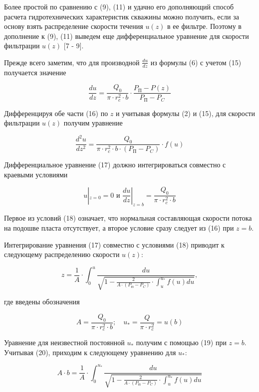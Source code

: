 \begin{multicols}{2}
Более простой по сравнению с (9), (11) и удачно его дополняющий способ
расчета гидротехнических характеристик скважины можно получить, если за
основу взять распределение скорости течения $u(z)$ в ее фильтре.
Поэтому в дополнение к (9), (11) выведем еще дифференциальное уравнение
для скорости фильтрации $u(z)$ {[}7 - 9{]}.

Прежде всего заметим, что для производной $\frac{du}{dz}$ из формулы
(6) с учетом (15) получается значение

\begin{equation}
\frac{du}{dz}=\frac{Q_0}{\pi\cdot r_c^2\cdot b}\cdot\frac{P_{\text{П}}-P(z)}{P_{\text{П}}-P_C}
\end{equation}

Дифференцируя обе части (16) по $z$ и учитывая формулы (2) и (15),
для скорости фильтрации $u(z)$ получим уравнение

\begin{equation}
\frac{d^2u}{dz^2}=\frac{Q_0}{\pi\cdot r_c^2\cdot b\cdot(P_{\text{П}}-P_C)}\cdot f(u)
\end{equation}

Дифференциальное уравнение (17) должно интегрироваться совместно с
краевыми условиями

\begin{equation}
u|_{z=0}=0\text{ и }\frac{du}{dz}|_{z=b}=\frac{Q_0}{\pi\cdot r_c^2\cdot b}
\end{equation}

Первое из условий (18) означает, что нормальная составляющая скорости
потока на подошве пласта отсутствует, а второе условие сразу следует из
(16) при $z=b$.

Интегрирование уравнения (17) совместно с условиями (18) приводит к
следующему распределению скорости $u(z)$:

\begin{equation}
z=\frac{1}{A}\cdot\int_0^u\frac{du}{\sqrt{1-\frac{2}{A\cdot(P_{\text{П}}-P_C)}\cdot\int_u^{u_*}f(u)du}},
\end{equation}

где введены обозначения

\begin{equation}
A=\frac{Q_0}{\pi\cdot r_c^2\cdot b};\quad u_*=\frac{Q}{\pi\cdot r_c^2}=u(b)
\end{equation}

Уравнение для неизвестной постоянной $u_*$ получим с
помощью (19) при $z=b$. Учитывая (20), приходим к следующему
уравнению для $u_*$:

\begin{equation}
A\cdot b=\frac{1}{A}\cdot\int_0^{u_*}\frac{du}{\sqrt{1-\frac{2}{A\cdot(P_{\text{П}}-P_C)}\cdot\int_u^{u_*}f(u)du}}
\end{equation}


\end{multicols}
